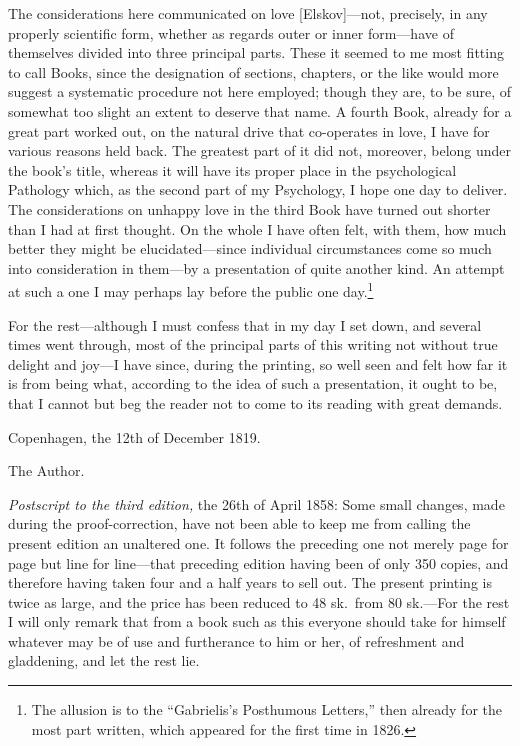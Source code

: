 \documentclass[12pt,a4paper]{book}
\begin{document}
The considerations here communicated on love [Elskov]---not, precisely,
in any properly scientific form, whether as regards outer or inner
form---have of themselves divided into three principal parts. These it
seemed to me most fitting to call Books, since the designation of
sections, chapters, or the like would more suggest a systematic procedure
not here employed; though they are, to be sure, of somewhat too slight an
extent to deserve that name. A fourth Book, already for a great part
worked out, on the natural drive that co-operates in love, I have for
various reasons held back. The greatest part of it did not, moreover,
belong under the book's title, whereas it will have its proper place in
the psychological Pathology which, as the second part of my Psychology, I
hope one day to deliver. The considerations on unhappy love in the third
Book have turned out shorter than I had at first thought. On the whole I
have often felt, with them, how much better they might be
elucidated---since individual circumstances come so much into
consideration in them---by a presentation of quite another kind. An
attempt at such a one I may perhaps lay before the public one
day.\footnote{The allusion is to the ``Gabrielis's Posthumous Letters,''
then already for the most part written, which appeared for the first time
in 1826.}

For the rest---although I must confess that in my day I set down, and
several times went through, most of the principal parts of this writing
not without true delight and joy---I have since, during the printing, so
well seen and felt how far it is from being what, according to the idea of
such a presentation, it ought to be, that I cannot but beg the reader not
to come to its reading with great demands.

\noindent Copenhagen, the 12th of December 1819.
\begin{flushright}
The Author.
\end{flushright}

\bigskip
\noindent\textit{Postscript to the third edition,} the 26th of April
1858: Some small changes, made during the proof-correction, have not been
able to keep me from calling the present edition an unaltered one. It
follows the preceding one not merely page for page but line for
line---that preceding edition having been of only 350 copies, and
therefore having taken four and a half years to sell out. The present
printing is twice as large, and the price has been reduced to 48 sk.\ from
80 sk.---For the rest I will only remark that from a book such as this
everyone should take for himself whatever may be of use and furtherance to
him or her, of refreshment and gladdening, and let the rest lie.
\end{document}
